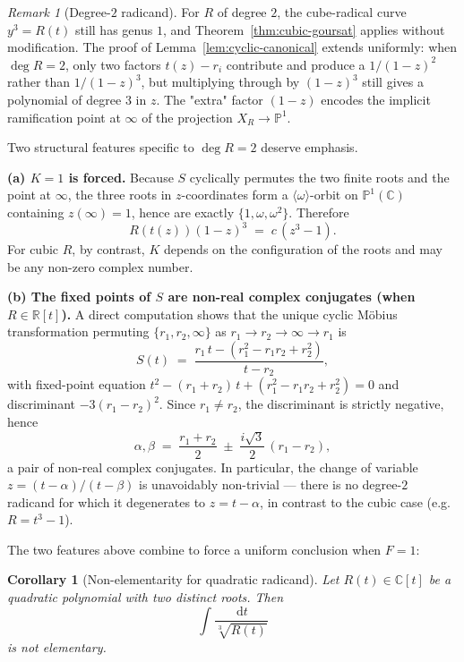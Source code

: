 \documentclass[11pt,a4paper]{article}
\theoremstyle{plain}
\newtheorem{corollary}[theorem]{Corollary}
\theoremstyle{definition}
\theoremstyle{remark}
\newtheorem{remark}[theorem]{Remark}
\newcommand{\C}{\mathbb{C}}
\newcommand{\R}{\mathbb{R}}
\renewcommand{\d}{\,\mathrm{d}}
\begin{document}
\begin{remark}[Degree-$2$ radicand]\label{rmk:degree-2}
For $R$ of degree $2$, the cube-radical curve $y^3 = R(t)$ still has genus $1$, and Theorem~\ref{thm:cubic-goursat} applies without modification. The proof of Lemma~\ref{lem:cyclic-canonical} extends uniformly: when $\deg R = 2$, only two factors $t(z) - r_i$ contribute and produce a $1/(1-z)^2$ rather than $1/(1-z)^3$, but multiplying through by $(1-z)^3$ still gives a polynomial of degree $3$ in $z$. The "extra" factor $(1-z)$ encodes the implicit ramification point at $\infty$ of the projection $X_R\to\mathbb{P}^1$.

Two structural features specific to $\deg R = 2$ deserve emphasis.

\medskip\noindent
\textbf{(a) $K = 1$ is forced.} Because $S$ cyclically permutes the two finite roots and the point at $\infty$, the three roots in $z$-coordinates form a $\langle\omega\rangle$-orbit on $\mathbb{P}^1(\C)$ containing $z(\infty) = 1$, hence are exactly $\{1,\omega,\omega^2\}$. Therefore
\[
  R(t(z))(1-z)^3 \;=\; c\,(z^3 - 1).
\]
For cubic $R$, by contrast, $K$ depends on the configuration of the roots and may be any non-zero complex number.

\medskip\noindent
\textbf{(b) The fixed points of $S$ are non-real complex conjugates (when $R\in\R[t]$).} A direct computation shows that the unique cyclic M\"obius transformation permuting $\{r_1, r_2, \infty\}$ as $r_1 \to r_2 \to \infty \to r_1$ is
\[
  S(t) \;=\; \frac{r_1\,t - (r_1^2 - r_1 r_2 + r_2^2)}{t - r_2},
\]
with fixed-point equation $t^2 - (r_1+r_2)\,t + (r_1^2 - r_1 r_2 + r_2^2) = 0$ and discriminant $-3(r_1-r_2)^2$. Since $r_1\neq r_2$, the discriminant is strictly negative, hence
\[
  \alpha,\beta \;=\; \frac{r_1+r_2}{2} \;\pm\; \frac{i\sqrt{3}}{2}\,(r_1-r_2),
\]
a pair of non-real complex conjugates. In particular, the change of variable $z = (t-\alpha)/(t-\beta)$ is unavoidably non-trivial — there is no degree-$2$ radicand for which it degenerates to $z = t - \alpha$, in contrast to the cubic case (e.g.\ $R = t^3 - 1$).
\end{remark}

The two features above combine to force a uniform conclusion when $F = 1$:

\begin{corollary}[Non-elementarity for quadratic radicand]\label{cor:degree2-nonelementary}
Let $R(t)\in\C[t]$ be a quadratic polynomial with two distinct roots. Then
\[
  \int \frac{\d t}{\sqrt[3]{R(t)}}
\]
is \emph{not} elementary.
\end{corollary}
\end{document}
